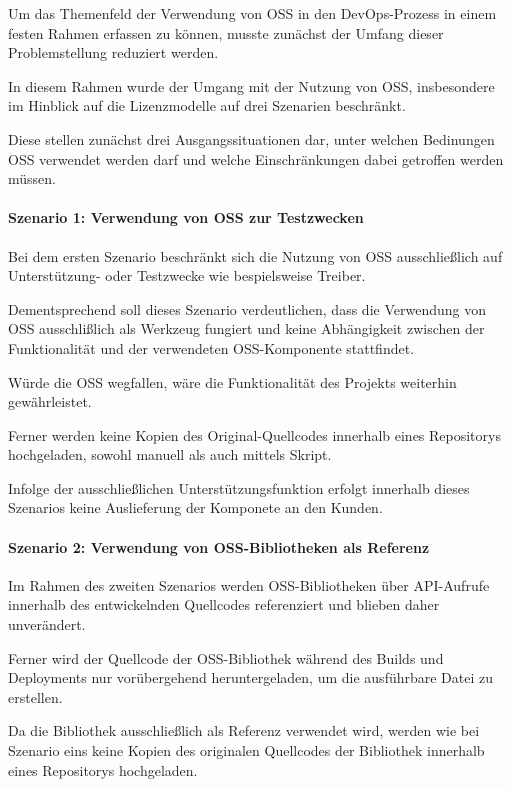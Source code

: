 Um das Themenfeld der Verwendung von OSS in den DevOps-Prozess in einem festen Rahmen erfassen zu können, musste zunächst der Umfang dieser Problemstellung reduziert werden.  

In diesem Rahmen wurde der Umgang mit der Nutzung von OSS, insbesondere im Hinblick auf die Lizenzmodelle auf drei Szenarien beschränkt. 

Diese stellen zunächst drei Ausgangssituationen dar, unter welchen Bedinungen OSS verwendet werden darf und welche Einschränkungen dabei getroffen werden müssen.   

\paragraph{Szenario 1: Verwendung von OSS zur Testzwecken}

Bei dem ersten Szenario beschränkt sich die Nutzung von OSS ausschließlich auf Unterstützung- oder Testzwecke wie bespielsweise Treiber. 

Dementsprechend soll dieses Szenario verdeutlichen, dass die Verwendung von OSS ausschlißlich als Werkzeug fungiert und keine Abhängigkeit zwischen der Funktionalität und der verwendeten OSS-Komponente stattfindet. 

Würde die OSS wegfallen, wäre die Funktionalität des Projekts weiterhin gewährleistet. 

Ferner werden keine Kopien des Original-Quellcodes innerhalb eines Repositorys hochgeladen, sowohl manuell als auch mittels Skript. 

Infolge der ausschließlichen Unterstützungsfunktion erfolgt innerhalb dieses Szenarios keine Auslieferung der Komponete an den Kunden. 

\paragraph{Szenario 2: Verwendung von OSS-Bibliotheken als Referenz}

Im Rahmen des zweiten Szenarios werden OSS-Bibliotheken über API-Aufrufe innerhalb des entwickelnden Quellcodes referenziert und blieben daher unverändert. 

Ferner wird der Quellcode der OSS-Bibliothek während des Builds und Deployments nur vorübergehend heruntergeladen, um die ausführbare Datei zu erstellen. 

Da die Bibliothek ausschließlich als Referenz verwendet wird, werden wie bei Szenario eins keine Kopien des originalen Quellcodes der Bibliothek innerhalb eines Repositorys hochgeladen.


